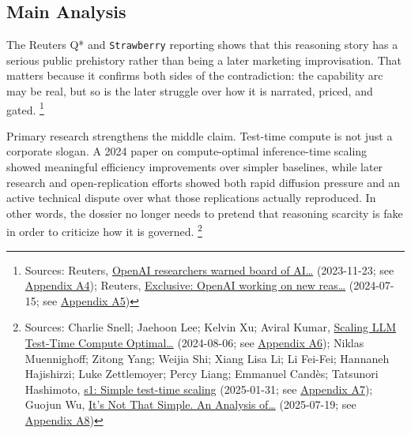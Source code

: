 \documentclass[
  american,
  11pt,
  letterpaper,
]{article}
\begin{document}
\subsection{Main Analysis}\label{main-analysis}

The Reuters Q* and \texttt{Strawberry} reporting shows that this
reasoning story has a serious public prehistory rather than being a
later marketing improvisation. That matters because it confirms both
sides of the contradiction: the capability arc may be real, but so is
the later struggle over how it is narrated, priced, and gated.
\footnote{Sources: Reuters,
  \href{https://www.reuters.com/technology/sam-altmans-ouster-openai-was-precipitated-by-letter-board-about-ai-breakthrough-2023-11-22/}{OpenAI
  researchers warned board of AI\ldots{}} (2023-11-23; see
  \hyperref[appendix-a4-openai-researchers-warned-board-of-ai-breakthrough-ahead-of-ceo-ouster-sources-say]{Appendix
  A4}); Reuters,
  \href{https://www.reuters.com/technology/artificial-intelligence/openai-working-new-reasoning-technology-under-code-name-strawberry-2024-07-12/}{Exclusive:
  OpenAI working on new reas\ldots{}} (2024-07-15; see
  \hyperref[appendix-a5-exclusive-openai-working-on-new-reasoning-technology-under-code-name-strawberry]{Appendix
  A5})}

Primary research strengthens the middle claim. Test-time compute is not
just a corporate slogan. A 2024 paper on compute-optimal inference-time
scaling showed meaningful efficiency improvements over simpler
baselines, while later research and open-replication efforts showed both
rapid diffusion pressure and an active technical dispute over what those
replications actually reproduced. In other words, the dossier no longer
needs to pretend that reasoning scarcity is fake in order to criticize
how it is governed. \footnote{Sources: Charlie Snell; Jaehoon Lee;
  Kelvin Xu; Aviral Kumar,
  \href{https://arxiv.org/abs/2408.03314}{Scaling LLM Test-Time Compute
  Optimal\ldots{}} (2024-08-06; see
  \hyperref[appendix-a6-scaling-llm-test-time-compute-optimally-can-be-more-effective-than-scaling-model-parameters]{Appendix
  A6}); Niklas Muennighoff; Zitong Yang; Weijia Shi; Xiang Lisa Li; Li
  Fei-Fei; Hannaneh Hajishirzi; Luke Zettlemoyer; Percy Liang; Emmanuel
  Candès; Tatsunori Hashimoto,
  \href{https://arxiv.org/abs/2501.19393}{s1: Simple test-time scaling}
  (2025-01-31; see
  \hyperref[appendix-a7-s1-simple-test-time-scaling]{Appendix A7});
  Guojun Wu, \href{https://arxiv.org/abs/2507.14419}{It's Not That
  Simple. An Analysis of\ldots{}} (2025-07-19; see
  \hyperref[appendix-a8-it-s-not-that-simple-an-analysis-of-simple-test-time-scaling]{Appendix
  A8})}
\end{document}
